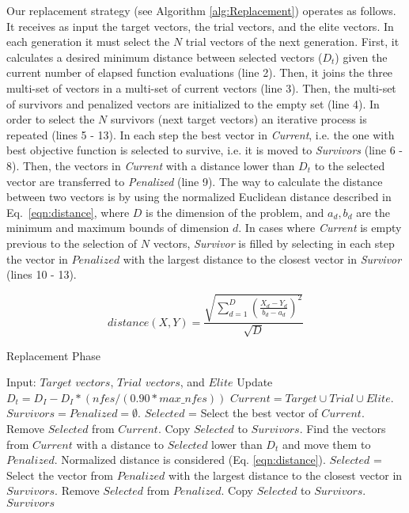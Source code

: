 Our replacement strategy (see Algorithm \ref{alg:Replacement}) operates as follows.
%
It receives as input the target vectors, the trial vectors, and the elite vectors.
%
In each generation it must select the $N$ trial vectors of the next generation.
%
First, it calculates a desired minimum distance between selected vectors ($D_t$) given the current number of elapsed function evaluations (line 2).
%
Then, it joins the three multi-set of vectors in a multi-set of current vectors (line 3).
%
Then, the multi-set of survivors and penalized vectors are initialized to the empty set (line 4).
%
In order to select the $N$ survivors (next target vectors) an iterative process is repeated (lines 5 - 13).
%
In each step the best vector in \textit{Current}, i.e. the one with best objective function is selected
to survive, i.e. it is moved to \textit{Survivors} (line 6 - 8).
%
Then, the vectors in \textit{Current} with a distance lower than $D_t$ to the selected vector are transferred to 
\textit{Penalized} (line 9).
%
The way to calculate the distance between two vectors is by using the normalized Euclidean distance described in Eq.~\ref{eqn:distance}, where $D$ is the dimension of the problem, and $a_d, b_d$ are the minimum and maximum bounds of dimension $d$.
%
%
In cases where \textit{Current} is empty previous to the selection of $N$ vectors, \textit{Survivor} is filled by selecting in each step 
the vector in $Penalized$ with the largest distance to the closest vector in \textit{Survivor} (lines 10 - 13).

\begin{equation}\label{eqn:distance}
distance ( X, Y ) = \frac{\sqrt{ \sum_{d=1}^D \left ( \frac{X_d - Y_d}{b_d - a_d} \right )^2  }} {\sqrt{D}}
\end{equation}


\begin{algorithm}[t]
  \scriptsize
	\caption{Replacement Phase} \label{alg:Replacement}
	\begin{algorithmic}[1]
	\STATE Input: $Target$ $vectors$, $Trial$ $vectors$, and $Elite$
	\STATE Update $D_t = D_I - D_I *(nfes/(0.90*max\_nfes)) $ 
	\STATE $Current = Target \cup Trial\cup Elite$.
	\STATE $Survivors = Penalized = \emptyset$.
	   \STATE $Selected$ = Select the best vector of $Current$.
		 \STATE Remove $Selected$ from $Current$.
	   \STATE Copy $Selected$ to $Survivors$.
	   \STATE Find the vectors from $Current$ with a distance to $Selected$ lower than $D_t$ and move them to $Penalized$. Normalized distance is considered (Eq. \ref{eqn:distance}).
	\ENDWHILE
	   \STATE $Selected$ = Select the vector from $Penalized$ with the largest distance to the closest vector in $Survivors$.
		 \STATE Remove $Selected$ from $Penalized$.
	   \STATE Copy $Selected$ to $Survivors$.
	\ENDWHILE
  \RETURN $Survivors$
\end{algorithmic}
\end{algorithm}


